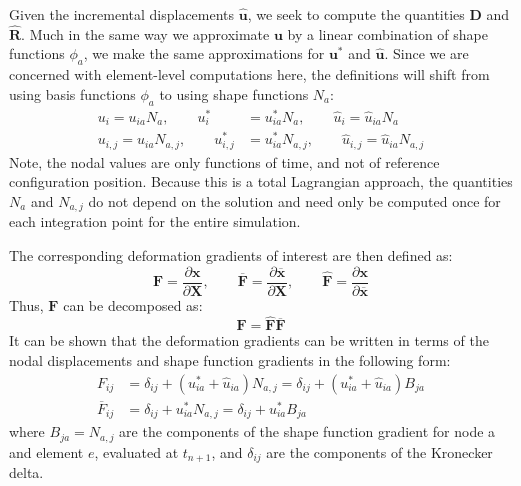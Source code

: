 Given the incremental displacements $\hat{\bm{u}}$, we seek to compute the quantities $\bm{D}$ and $\hat{\bm{R}}$. Much in the same way we approximate $\bm{u}$ by a linear combination of shape functions $\phi_a$, we make the same approximations for $\bm{u}^*$ and $\hat{\bm{u}}$. Since we are concerned with element-level computations here, the definitions will shift from using basis functions $\phi_a$ to using shape functions $N_a$:
\begin{align}
u_i = u_{ia}N_a, \qquad u^*_i &= u^*_{ia}N_a, \qquad \hat{u}_i = \hat{u}_{ia}N_a \\
u_{i,j} = u_{ia}N_{a,j}, \qquad u^*_{i,j} &= u^*_{ia}N_{a,j}, \qquad \hat{u}_{i,j} = \hat{u}_{ia}N_{a,j}
\end{align}
Note, the nodal values are only functions of time, and not of reference configuration position. Because this is a total Lagrangian approach, the quantities $N_a$ and $N_{a,j}$ do not depend on the solution and need only be computed once for each integration point for the entire simulation.

The corresponding deformation gradients of interest are then defined as:
\begin{equation}
\bm{F} = \frac{\partial \bm{x}}{\partial \bm{X}}, \qquad \overline{\bm{F}} = \frac{\partial \overline{\bm{x}}}{\partial \bm{X}}, \qquad \hat{\bm{F}} = \frac{\partial \bm{x}}{\partial \overline{\bm{x}}}
\end{equation}
Thus, $\bm{F}$ can be decomposed as:
\begin{equation}
\bm{F} = \hat{\bm{F}}\overline{\bm{F}}
\end{equation}
It can be shown that the deformation gradients can be written in terms of the nodal displacements and shape function gradients in the following form:
\begin{align}
F_{ij} &= \delta_{ij} + \left(u^*_{ia} + \hat{u}_{ia} \right) N_{a,j} = \delta_{ij} + \left(u^*_{ia} + \hat{u}_{ia} \right) B_{ja} \\
\overline{F}_{ij} &= \delta_{ij} + u^*_{ia} N_{a,j} = \delta_{ij} + u^*_{ia} B_{ja}
\end{align}
where $B_{ja} = N_{a,j}$ are the components of the shape function gradient for node a and element $e$, evaluated at $t_{n+1}$, and $\delta_{ij}$ are the components of the Kronecker delta.

